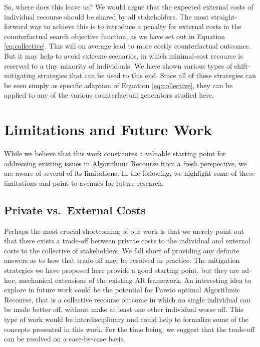 \documentclass[conference,final,]{IEEEtran}
\theoremstyle{definition}
\theoremstyle{definition}
\theoremstyle{definition}
\theoremstyle{definition}
\theoremstyle{remark}
\begin{document}
So, where does this leave us? We would argue that the expected external costs of individual recourse should be shared by all stakeholders. The most straight-forward way to achieve this is to introduce a penalty for external costs in the counterfactual search objective function, as we have set out in Equation \eqref{eq:collective}. This will on average lead to more costly counterfactual outcomes. But it may help to avoid extreme scenarios, in which minimal-cost recourse is reserved to a tiny minority of individuals. We have shown various types of shift-mitigating strategies that can be used to this end. Since all of these strategies can be seen simply as specific adaption of Equation \eqref{eq:collective}, they can be applied to any of the various counterfactual generators studied here.

\hypertarget{limit}{%
\section{Limitations and Future Work}\label{limit}}

While we believe that this work constitutes a valuable starting point for addressing existing issues in Algorithmic Recourse from a fresh perspective, we are aware of several of its limitations. In the following, we highlight some of these limitations and point to avenues for future research.

\hypertarget{private-vs.-external-costs}{%
\subsection{Private vs.~External Costs}\label{private-vs.-external-costs}}

Perhaps the most crucial shortcoming of our work is that we merely point out that there exists a trade-off between private costs to the individual and external costs to the collective of stakeholders. We fall short of providing any definite answers as to how that trade-off may be resolved in practice. The mitigation strategies we have proposed here provide a good starting point, but they are ad-hoc, mechanical extensions of the existing AR framework. An interesting idea to explore in future work could be the potential for Pareto optimal Algorithmic Recourse, that is a collective recourse outcome in which no single individual can be made better off, without make at least one other individual worse off. This type of work would be interdisciplinary and could help to formalize some of the concepts presented in this work. For the time being, we suggest that the trade-off can be resolved on a case-by-case basis.
\end{document}
